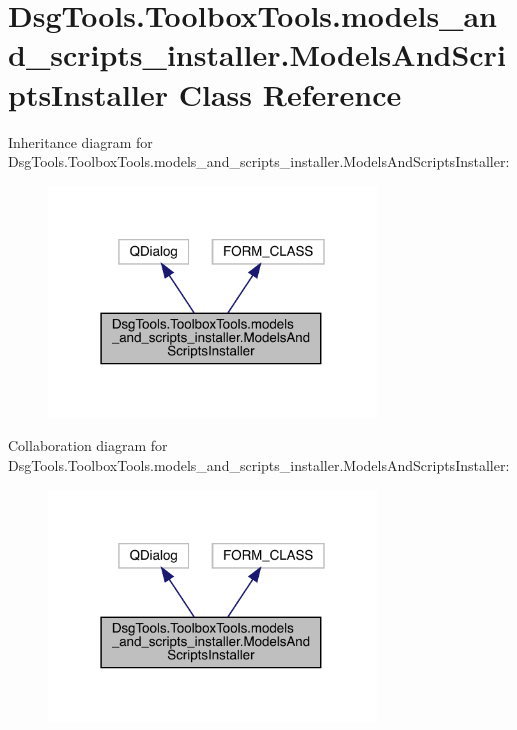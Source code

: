 \hypertarget{class_dsg_tools_1_1_toolbox_tools_1_1models__and__scripts__installer_1_1_models_and_scripts_installer}{}\section{Dsg\+Tools.\+Toolbox\+Tools.\+models\+\_\+and\+\_\+scripts\+\_\+installer.\+Models\+And\+Scripts\+Installer Class Reference}
\label{class_dsg_tools_1_1_toolbox_tools_1_1models__and__scripts__installer_1_1_models_and_scripts_installer}


Inheritance diagram for Dsg\+Tools.\+Toolbox\+Tools.\+models\+\_\+and\+\_\+scripts\+\_\+installer.\+Models\+And\+Scripts\+Installer\+:
\nopagebreak
\begin{figure}[H]
\begin{center}
\leavevmode
\includegraphics[width=247pt]{class_dsg_tools_1_1_toolbox_tools_1_1models__and__scripts__installer_1_1_models_and_scripts_installer__inherit__graph}
\end{center}
\end{figure}


Collaboration diagram for Dsg\+Tools.\+Toolbox\+Tools.\+models\+\_\+and\+\_\+scripts\+\_\+installer.\+Models\+And\+Scripts\+Installer\+:
\nopagebreak
\begin{figure}[H]
\begin{center}
\leavevmode
\includegraphics[width=247pt]{class_dsg_tools_1_1_toolbox_tools_1_1models__and__scripts__installer_1_1_models_and_scripts_installer__coll__graph}
\end{center}
\end{figure}
